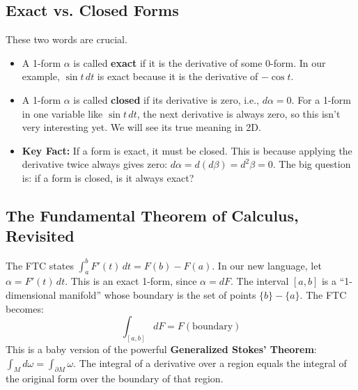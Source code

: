 \documentclass[12pt, letterpaper]{article}
\begin{document}
	\subsection{Exact vs. Closed Forms}
	These two words are crucial.
	\begin{itemize}
		\item A 1-form $\alpha$ is called \textbf{exact} if it is the derivative of some 0-form. In our example, $\sin t \, dt$ is exact because it is the derivative of $-\cos t$.
		\begin{center}
		\end{center}
		\item A 1-form $\alpha$ is called \textbf{closed} if its derivative is zero, i.e., $d\alpha = 0$. For a 1-form in one variable like $\sin t \, dt$, the next derivative is always zero, so this isn't very interesting yet. We will see its true meaning in 2D.
		\begin{center}
		\end{center}
		\item \textbf{Key Fact:} If a form is exact, it must be closed. This is because applying the derivative twice always gives zero: $d\alpha = d(d\beta) = d^2\beta = 0$. The big question is: if a form is closed, is it always exact?
	\end{itemize}
	
	\subsection{The Fundamental Theorem of Calculus, Revisited}
	The FTC states $\int_a^b F'(t) \, dt = F(b) - F(a)$. In our new language, let $\alpha = F'(t) \, dt$. This is an exact 1-form, since $\alpha = dF$. The interval $[a,b]$ is a ``1-dimensional manifold'' whose boundary is the set of points $\{b\} - \{a\}$. The FTC becomes:
	\begin{equation*}
		\int_{[a,b]} dF = F(\text{boundary})
	\end{equation*}
	This is a baby version of the powerful \textbf{Generalized Stokes' Theorem}: $\int_M d\omega = \int_{\partial M} \omega$. The integral of a derivative over a region equals the integral of the original form over the boundary of that region.
	
\end{document}
